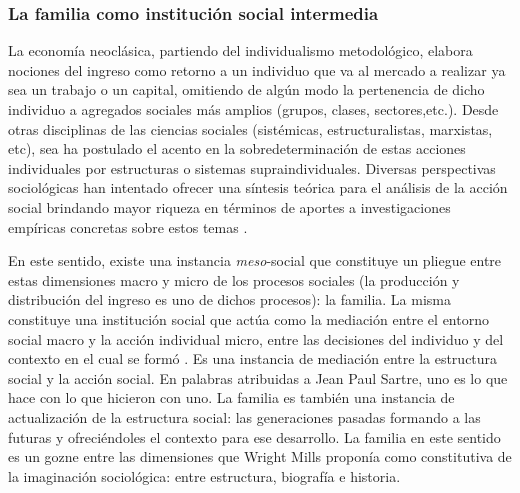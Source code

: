 	
\subsubsection{La familia como institución social intermedia }
	
La economía neoclásica, partiendo del individualismo metodológico, elabora nociones del ingreso como retorno a un individuo que va al mercado a realizar ya sea un trabajo o un capital, omitiendo de algún modo la pertenencia de dicho individuo a agregados sociales más amplios (grupos, clases, sectores,etc.). Desde otras disciplinas de las ciencias sociales (sistémicas, estructuralistas, marxistas, etc), sea ha postulado el acento en la sobredeterminación de estas acciones individuales por estructuras o sistemas supraindividuales. Diversas perspectivas sociológicas han intentado ofrecer una síntesis teórica para el análisis de la acción social \cite{bourdieu1991,bourdieu2001} brindando mayor riqueza en términos de aportes a investigaciones empíricas concretas sobre estos temas \cite{soja}.
	
En este sentido, existe una instancia \textit{meso}-social que constituye un pliegue entre estas dimensiones macro y micro de los procesos sociales (la producción y distribución del ingreso es uno de dichos procesos): la familia. La misma constituye una institución social que actúa como la mediación entre el entorno social macro y la acción individual micro, entre las decisiones del individuo y del contexto en el cual se formó \cite{torrado1998,jelin}. Es una instancia de mediación entre la estructura social y la acción social. En palabras atribuidas a Jean Paul Sartre, uno es lo que hace con lo que hicieron con uno. La familia es también una instancia de actualización de la estructura social: las generaciones pasadas formando a las futuras y ofreciéndoles el contexto para ese desarrollo. La familia en este sentido es un gozne entre las dimensiones que Wright Mills \citeyear{wrightmills} proponía como constitutiva de la imaginación sociológica: entre estructura, biografía e historia.
	
